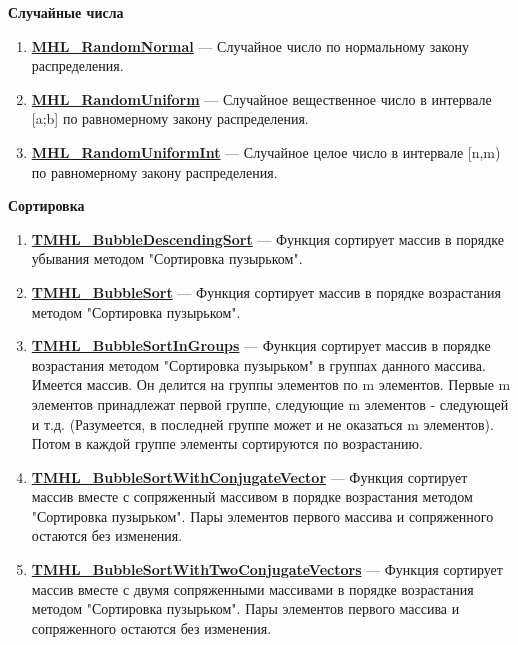 \documentclass[a4paper,12pt]{article}
\begin{document}
\textbf{Случайные числа}
\begin{enumerate}

\item \textbf{\hyperref[MHL_RandomNormal]{MHL\_RandomNormal}} --- Случайное число по нормальному закону распределения.

\item \textbf{\hyperref[MHL_RandomUniform]{MHL\_RandomUniform}} --- Случайное вещественное число в интервале [a;b] по равномерному закону распределения.

\item \textbf{\hyperref[MHL_RandomUniformInt]{MHL\_RandomUniformInt}} --- Случайное целое число в интервале [n,m) по равномерному закону распределения.

\end{enumerate}

\textbf{Сортировка}
\begin{enumerate}

\item \textbf{\hyperref[TMHL_BubbleDescendingSort]{TMHL\_BubbleDescendingSort}} --- Функция сортирует массив в порядке убывания методом "Сортировка пузырьком".

\item \textbf{\hyperref[TMHL_BubbleSort]{TMHL\_BubbleSort}} --- Функция сортирует массив в порядке возрастания методом "Сортировка пузырьком".

\item \textbf{\hyperref[TMHL_BubbleSortInGroups]{TMHL\_BubbleSortInGroups}} --- Функция сортирует массив в порядке возрастания методом "Сортировка пузырьком" в группах данного массива. Имеется массив. Он делится на группы элементов по m элементов. Первые m элементов принадлежат первой группе, следующие m элементов - следующей и т.д. (Разумеется, в последней группе может и не оказаться m элементов). Потом в каждой группе элементы сортируются по возрастанию.

\item \textbf{\hyperref[TMHL_BubbleSortWithConjugateVector]{TMHL\_BubbleSortWithConjugateVector}} --- Функция сортирует массив вместе с сопряженный массивом в порядке возрастания методом "Сортировка пузырьком". Пары элементов первого массива и сопряженного остаются без изменения.

\item \textbf{\hyperref[TMHL_BubbleSortWithTwoConjugateVectors]{TMHL\_BubbleSortWithTwoConjugateVectors}} --- Функция сортирует массив вместе с двумя сопряженными массивами в порядке возрастания методом "Сортировка пузырьком". Пары элементов первого массива и сопряженного остаются без изменения.

\end{enumerate}
\end{document}
